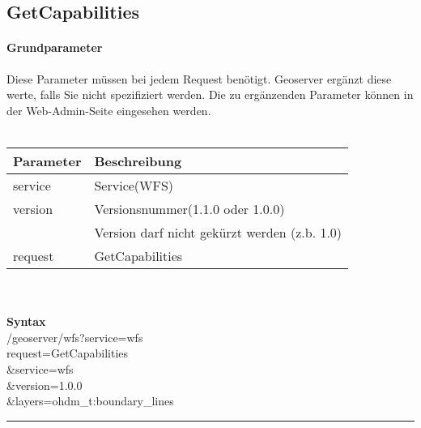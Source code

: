 \documentclass[12pt]{article}
\begin{document}
\subsection{GetCapabilities}
\paragraph{Grundparameter} Diese Parameter müssen bei jedem Request benötigt. Geoserver ergänzt diese werte, falls Sie nicht spezifiziert werden. Die zu ergänzenden Parameter können in der Web-Admin-Seite eingesehen werden.\\
\vspace{2em}\\
\begin{tabular}{ll}
\textbf{Parameter} & \textbf{Beschreibung}\\
\hline 
service  & Service(WFS) \\ 
\hline 
version  & Versionsnummer(1.1.0 oder 1.0.0) \\&Version darf nicht gekürzt werden (z.b. 1.0)\\ 
\hline 
request  & GetCapabilities \\ 
\hline 
\end{tabular}\\
\vspace{2em}\\
\textbf{Syntax}\\
/geoserver/wfs?service=wfs\\
request=GetCapabilities\\
\&service=wfs\\
\&version=1.0.0\\
\&layers=ohdm\_t:boundary\_lines\\

\hrule
\end{document}
